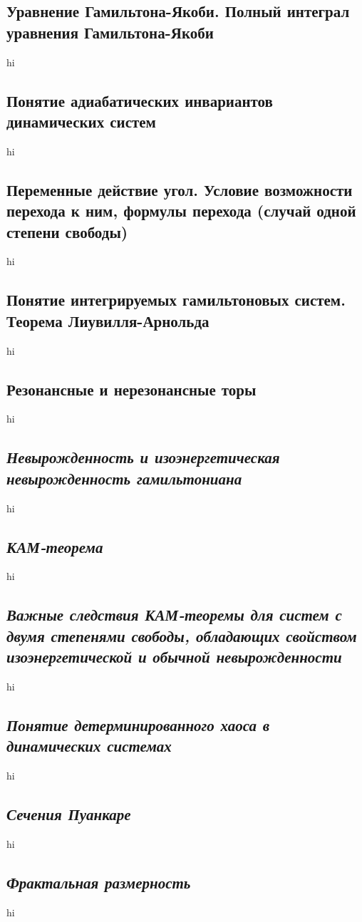 \documentclass[a4paper,12pt]{article}
\begin{document}
\subsection{Уравнение Гамильтона-Якоби. Полный интеграл уравнения
Гамильтона-Якоби}
hi
\subsection{Понятие адиабатических инвариантов динамических систем}
hi
\subsection{Переменные действие угол. Условие возможности перехода к ним,
формулы
перехода (случай одной степени свободы)}
hi
\subsection{Понятие интегрируемых гамильтоновых систем. Теорема
Лиувилля-Арнольда}
hi
\subsection{Резонансные и нерезонансные торы}
hi
\subsection{\emph{Невырожденность и изоэнергетическая невырожденность
гамильтониана}}
hi
\subsection{\emph{КАМ-теорема}}
hi
\subsection{\emph{Важные следствия КАМ-теоремы для систем с двумя степенями свободы,
обладающих свойством изоэнергетической и обычной невырожденности}}
hi
\subsection{\emph{Понятие детерминированного хаоса в динамических системах}}
hi
\subsection{\emph{Сечения Пуанкаре}}
hi
\subsection{\emph{Фрактальная размерность}}
hi
\end{document}

